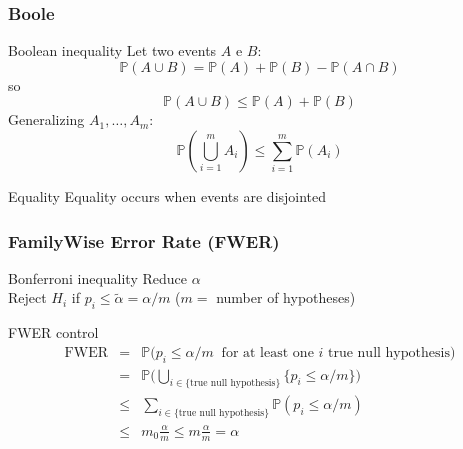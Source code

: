 \documentclass[xcolor={dvipsnames}]{beamer}
\newcommand{\bb}[1]{\begin{block}{#1}}
\newcommand{\eb}{\end{block}}
\newcommand{\bfr}[1]{\begin{frame} \frametitle{#1}}
\begin{document}
\bfr{Boole}
  \bb{Boolean inequality}
    Let two events $A$ e $B$:
    \[ \mathbb{P}(A \cup B) = \mathbb{P}(A) + \mathbb{P}(B) - \mathbb{P}(A \cap B) \]
    so
    \[ \mathbb{P}(A \cup B) \leq \mathbb{P}(A) + \mathbb{P}(B) \]
    Generalizing $A_1, \ldots, A_m$:
    \[ \mathbb{P}(\bigcup_{i=1}^m A_i) \leq \sum_{i=1}^m \mathbb{P}(A_i) \]
  \eb
  \bb{Equality}
    Equality occurs when events are disjointed
  \eb
\end{frame}


\bfr{FamilyWise Error Rate (FWER)}


\bb{Bonferroni inequality}
     {Reduce $\alpha$} \\
    Reject $H_i$ if $p_i \leq \widetilde{\alpha} =\alpha/m$ ($m=$ number of hypotheses)
\eb
  \bb{FWER control}
    \begin{eqnarray*}
    \mathrm{FWER} &=& \mathbb{P} \big(p_i \leq \alpha/m\ \text{ for at least one $i$ true null hypothesis} \big) \\
    &=& \mathbb{P} \Big( \bigcup_{i\in \{\text{true null hypothesis}\}} \{p_i \leq \alpha/m\} \Big) \\
    &\leq& \sum_{i \in \{\text{true null hypothesis}\}} \mathbb{P} (p_i \leq \alpha/m) \\
    &\leq& m_0\frac{\alpha}{m} \leq m \frac{\alpha}{m}  = \alpha
    \end{eqnarray*}
  \eb
\end{frame}
% 
% 
% 
\end{document}
